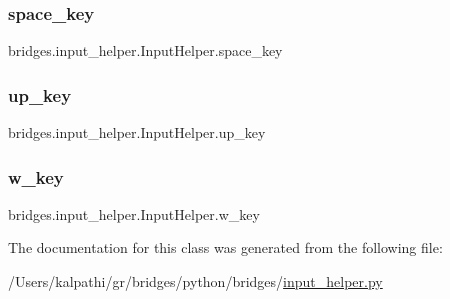 \subsubsection{\texorpdfstring{space\_key}{space\_key}}
{\footnotesize\ttfamily bridges.\+input\+\_\+helper.\+Input\+Helper.\+space\+\_\+key}

\mbox{\label{classbridges_1_1input__helper_1_1_input_helper_ab73e09b11d389d7dd63f0772eba7f39e}} 
\subsubsection{\texorpdfstring{up\_key}{up\_key}}
{\footnotesize\ttfamily bridges.\+input\+\_\+helper.\+Input\+Helper.\+up\+\_\+key}

\mbox{\label{classbridges_1_1input__helper_1_1_input_helper_a5805e22dfd0bda43e27aacb3bc638df3}} 
\subsubsection{\texorpdfstring{w\_key}{w\_key}}
{\footnotesize\ttfamily bridges.\+input\+\_\+helper.\+Input\+Helper.\+w\+\_\+key}



The documentation for this class was generated from the following file\+:\begin{DoxyCompactItemize}
\item 
/\+Users/kalpathi/gr/bridges/python/bridges/\mbox{\hyperlink{input__helper_8py}{input\+\_\+helper.\+py}}\end{DoxyCompactItemize}
